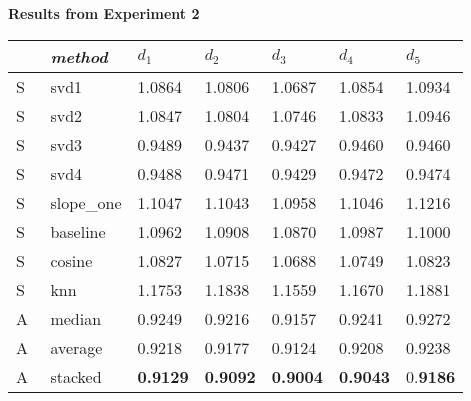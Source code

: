 \begin{table}[p]
  \centering

  \textbf{Results from Experiment 2}

  \vspace{3em}

  \begin{tabular*}{\textwidth}{ l p{3cm} p{1.5cm} p{1.5cm} p{1.5cm} p{1.5cm} p{1.5cm} }
    \toprule
      ~ & \emph{method} & 
      $d_1$ & $d_2$ & $d_3$ & $d_4$ & $d_5$ \\ 
    \midrule
    S & svd1       &   1.0864  &  1.0806  &  1.0687  &  1.0854  &  1.0934  \\
    S & svd2       &   1.0847  &  1.0804  &  1.0746  &  1.0833  &  1.0946  \\
    S & svd3       &   0.9489  &  0.9437  &  0.9427  &  0.9460  &  0.9460  \\
    S & svd4       &   0.9488  &  0.9471  &  0.9429  &  0.9472  &  0.9474  \\
    S & slope\_one &   1.1047  &  1.1043  &  1.0958  &  1.1046  &  1.1216  \\
    S & baseline   &   1.0962  &  1.0908  &  1.0870  &  1.0987  &  1.1000  \\
    S & cosine     &   1.0827  &  1.0715  &  1.0688  &  1.0749  &  1.0823  \\
    S & knn        &   1.1753  &  1.1838  &  1.1559  &  1.1670  &  1.1881  \\
    \midrule
    A & median     &   0.9249  &  0.9216  &  0.9157  &  0.9241  &  0.9272  \\    
    A & average    &   0.9218  &  0.9177  &  0.9124  &  0.9208  &  0.9238  \\
    A & stacked    &   \textbf{0.9129}  &  \textbf{0.9092}  &  \textbf{0.9004}  &  \textbf{0.9043}  &  0.\textbf{9186}  \\    
    \bottomrule
  \end{tabular*}

  \vspace{3em}


\end{table}
